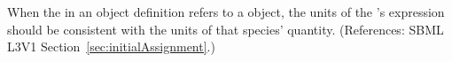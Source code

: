 When the  in an \InitialAssignment object definition refers
to a \Species object, the units of the \InitialAssignment's 
expression should be consistent with the units of that species' quantity.
(References: SBML L3V1 Section~\ref{sec:initialAssignment}.)
